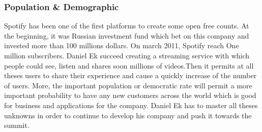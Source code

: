 \subsubsection{Population \& Demographic}
Spotify has been one of the first platforms to create some open free counts. At the beginning, it was Russian investment fund which bet on this company and invested more than 100 millions dollars. On march 2011, Spotify reach One million subscribers. Daniel Ek succeed creating  a streaming service with which people could see, listen and shares soon millions of videos.Then it permits at all theses users to share their experience and cause a quickly increase of the number of users. More, the important population or democratic rate will permit a more important probability to have any new customers across the world which is good for business and applications for the company. Daniel Ek has to master all theses unknowns in order to continue to develop his company and push it towards the summit. 